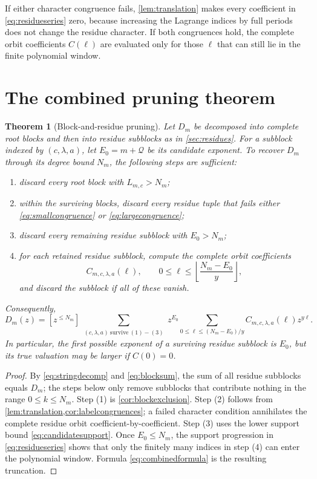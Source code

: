 \documentclass[11pt]{amsart}
\newtheorem{theorem}{Theorem}[section]
\theoremstyle{remark}
\begin{document}
If either character congruence fails, \cref{lem:translation} makes every coefficient in \eqref{eq:residueseries} zero, because increasing the Lagrange indices by full periods does not change the residue character.  If both congruences hold, the complete orbit coefficients $C(\ell)$ are evaluated only for those $\ell$ that can still lie in the finite polynomial window.

\section{The combined pruning theorem}

\begin{theorem}[Block-and-residue pruning]\label{thm:combined}
Let $D_m$ be decomposed into complete root blocks and then into residue subblocks as in \cref{sec:residues}.  For a subblock indexed by $(c,\lambda,a)$, let $E_0=m+\mathcal Q$ be its candidate exponent.  To recover $D_m$ through its degree bound $N_m$, the following steps are sufficient:
\begin{enumerate}
\item discard every root block with $L_{m,c}>N_m$;
\item within the surviving blocks, discard every residue tuple that fails either \eqref{eq:smallcongruence} or \eqref{eq:largecongruence};
\item discard every remaining residue subblock with $E_0>N_m$;
\item for each retained residue subblock, compute the complete orbit coefficients
\[
    C_{m,c,\lambda,a}(\ell),
    \qquad
    0\leq\ell\leq
    \left\lfloor\frac{N_m-E_0}{y}\right\rfloor,
\]
and discard the subblock if all of these vanish.
\end{enumerate}
Consequently,
\begin{equation}\label{eq:combinedformula}
 D_m(z)
 =[z^{\leq N_m}]
 \sum_{\substack{(c,\lambda,a)\ \mathrm{survive}\ (1)-(3)}}
 z^{E_0}
 \sum_{0\leq\ell\leq(N_m-E_0)/y}
 C_{m,c,\lambda,a}(\ell)z^{y\ell}.
\end{equation}
In particular, the first possible exponent of a surviving residue subblock is $E_0$, but its true valuation may be larger if $C(0)=0$.
\end{theorem}

\begin{proof}
By \eqref{eq:stringdecomp} and \eqref{eq:blocksum}, the sum of all residue subblocks equals $D_m$; the steps below only remove subblocks that contribute nothing in the range $0\leq k\leq N_m$.  Step (1) is \cref{cor:blockexclusion}.  Step (2) follows from \cref{lem:translation,cor:labelcongruences}; a failed character condition annihilates the complete residue orbit coefficient-by-coefficient.  Step (3) uses the lower support bound \eqref{eq:candidatesupport}.  Once $E_0\leq N_m$, the support progression in \eqref{eq:residueseries} shows that only the finitely many indices in step (4) can enter the polynomial window.  Formula \eqref{eq:combinedformula} is the resulting truncation.
\end{proof}
\end{document}
